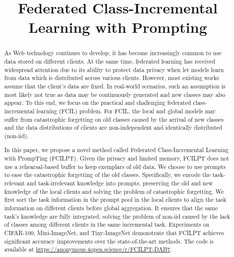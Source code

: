 \documentclass[sigconf,anonymous,review,screen]{acmart}
\begin{document}
\title{Federated Class-Incremental Learning with Prompting}



\begin{abstract}
As Web technology continues to develop, it has become increasingly common to use data stored on different clients. At the same time, federated learning has received widespread attention due to its ability to protect data privacy when let models learn from data which is distributed across various clients. However, most existing works assume that the client's data are fixed. In real-world scenarios, such an assumption is most likely not true as data may be continuously generated and new classes may also appear. To this end, we focus on the practical and challenging federated class-incremental learning (FCIL) problem. For FCIL, the local and global models may suffer from catastrophic forgetting on old classes caused by the arrival of new classes and the data distributions of clients are non-independent and identically distributed (non-iid). 

In this paper, we propose a novel method called  Federated Class-Incremental Learning with PrompTing (FCILPT). Given the privacy and limited memory, FCILPT does not use a rehearsal-based buffer to keep exemplars of old data. We choose to use prompts to ease the catastrophic forgetting of the old classes. Specifically, we encode the task-relevant and task-irrelevant knowledge into prompts, preserving the old and new knowledge of the local clients and solving the problem of catastrophic forgetting. We first sort the task information in the prompt pool in the local clients to align the task information on different clients before global aggregation. It ensures that the same task's knowledge are fully integrated, solving the problem of non-iid caused by the lack of classes among different clients in the same incremental task. Experiments on CIFAR-100, Mini-ImageNet, and Tiny-ImageNet demonstrate that FCILPT achieves significant accuracy improvements over the state-of-the-art methods. The code is available at \url{https://anonymous.4open.science/r/FCILPT-DAB7}.
\end{abstract}

%
\end{document}
